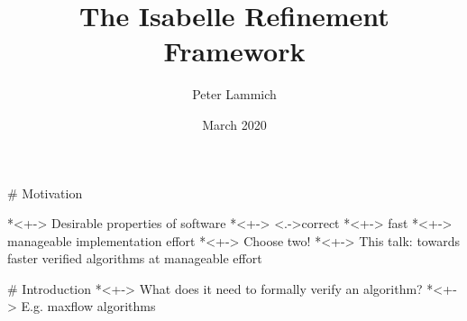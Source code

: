 \documentclass[fleqn]{beamer}
\title{The Isabelle Refinement Framework}
\author[Peter Lammich]{Peter Lammich}
\institute[UoM] %
{ The University of Manchester}
\date {March 2020}
\begin{document}
% 

\begin{frame}
  \titlepage
\end{frame}


\newcommand{\insertsectitle}{}

\setbeamertemplate{frametitle}{\vspace{.7em}\insertframetitle\hfill \small\raisebox{10pt}{\insertsectitle}}

# Motivation

  *<+-> Desirable properties of software
    *<+-> \onslide<.->{correct}
    *<+-> fast
    *<+-> manageable implementation effort
  *<+-> Choose two!
  *<+-> This talk: towards faster verified algorithms at manageable effort

\def\algoAugment{
  \begin{algorithmic}
    \Procedure{augment}{$g,f,p$}
      \State{$c_p \gets \min\{ g_f(u,v) \mid (u,v)\in p \}$}
      \ForAll{$(u,v)\in p$}
        \If{$(u,v)\in g$}~$f(u,v)\gets f(u,v) + c_p$
        \Else~$f(v,u)\gets f(v,u) - c_p$
        \EndIf
      \EndFor
      \Return{$f$}
    \EndProcedure
  \end{algorithmic}
}

\def\algoEdka{
  \begin{algorithmic}
    \Procedure{Edmonds-Karp}{$g,s,t$}
      \State{$f\gets \lambda(u,v).~0$}
      \While{exists augmenting path in $g_f$}
        \State{$p \gets {}$ shortest augmenting path}
        \State{$f \gets $\Call{augment}{$g,f,p$}}
      \EndWhile
    \EndProcedure
  \end{algorithmic}
}

# Introduction
  *<+-> What does it need to formally verify an algorithm?
    *<+-> E.g. maxflow algorithms
\end{document}
